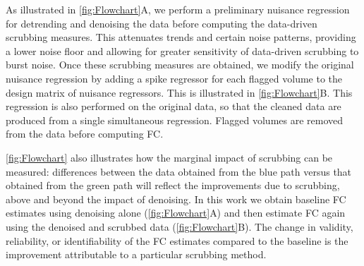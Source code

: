 \documentclass{article}
\begin{document}
As illustrated in \autoref{fig:Flowchart}A, we perform a preliminary nuisance regression for detrending and denoising the data before computing the data-driven scrubbing measures. This attenuates trends and certain noise patterns, providing a lower noise floor and allowing for greater sensitivity of data-driven scrubbing to burst noise. Once these scrubbing measures are obtained, we modify the original nuisance regression by adding a spike regressor for each flagged volume to the design matrix of nuisance regressors. This is illustrated in \autoref{fig:Flowchart}B. This regression is also performed on the original data, so that the cleaned data are produced from a single simultaneous regression. Flagged volumes are removed from the data before computing FC.

\autoref{fig:Flowchart} also illustrates how the marginal impact of scrubbing can be measured: differences between the data obtained from the blue path versus that obtained from the green path will reflect the improvements due to scrubbing, above and beyond the impact of denoising. In this work we obtain baseline FC estimates using denoising alone (\autoref{fig:Flowchart}A) and then estimate FC again using the denoised and scrubbed data (\autoref{fig:Flowchart}B). The change in validity, reliability, or identifiability of the FC estimates compared to the baseline is the improvement attributable to a particular scrubbing method.%

\end{document}
